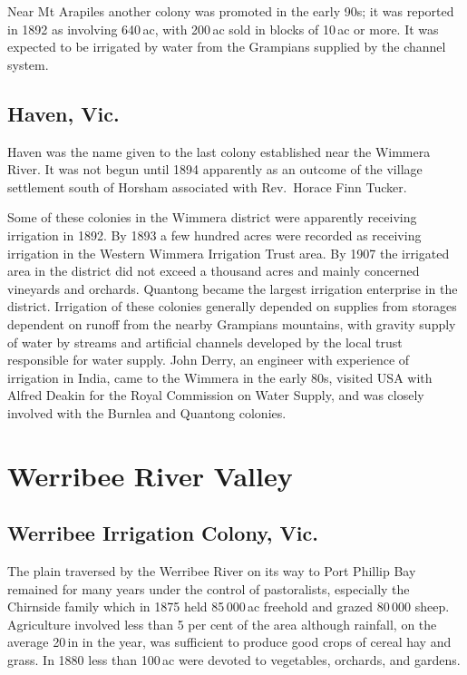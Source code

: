 Near Mt Arapiles another colony was promoted in the early 90s; it was
reported in 1892 as involving 640\,ac, with 200\,ac sold in blocks of
10\,ac or more.  It was expected to be irrigated by water from the
Grampians supplied by the channel system.

\subsection*{Haven, Vic.}

Haven was the name given to the last colony established near the
Wimmera River.  It was not begun until 1894 apparently as an outcome
of the village settlement south of Horsham associated with Rev.~Horace
Finn Tucker.

Some of these colonies in the Wimmera district were apparently
receiving irrigation in 1892.  By 1893 a few hundred acres were
recorded as receiving irrigation in the Western Wimmera Irrigation
Trust area. By 1907 the irrigated area in the district did not exceed
a thousand acres and mainly concerned vineyards and orchards. Quantong
became the largest irrigation enterprise in the district.  Irrigation
of these colonies generally depended on supplies from storages
dependent on runoff from the nearby Grampians mountains, with gravity
supply of water by streams and artificial channels developed by the
local trust responsible for water supply. John Derry, an engineer with
experience of irrigation in India, came to the Wimmera in the early
80s, visited USA with Alfred Deakin for the Royal Commission on Water
Supply, and was closely involved with the Burnlea and Quantong
colonies.

\section*{Werribee River Valley}

\subsection*{Werribee Irrigation Colony, Vic.}

The plain traversed by the Werribee River on its way to Port Phillip
Bay remained for many years under the control of pastoralists,
especially the Chirnside family which in 1875 held 85\,000\,ac
freehold and grazed 80\,000 sheep.  Agriculture involved less than 5
per cent of the area although rainfall, on the average 20\,in in the
year, was sufficient to produce good crops of cereal hay and grass.
In 1880 less than 100\,ac were devoted to vegetables, orchards, and
gardens.


